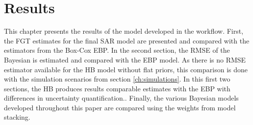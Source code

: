 \chapter{Results}

This chapter presents the results of the model developed in the workflow.
First, the FGT estimates for the final SAR model are presented and compared with the estimators from the Box-Cox EBP.
In the second section, the RMSE of the Bayesian is estimated and compared with the EBP model.
As there is no RMSE estimator available for the HB model without flat priors, this comparison is done with the simulation scenarios from section \ref{ch:simulations}.
In this first two sections, the HB produces results comparable estimates with the EBP with differences in uncertainty quantification..
Finally, the various Bayesian models developed throughout this paper are compared using the weights from model stacking.









